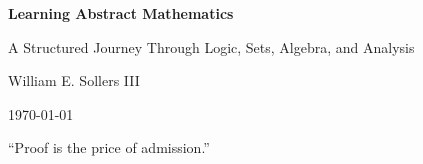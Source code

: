 \documentclass[12pt, a4paper]{report}
\begin{document}
\ExplSyntaxOff
\renewcommand{\familydefault}{\ttdefault}
\begin{titlepage}
  \centering
  \vspace*{2.5cm}
  {\Huge\bfseries Learning Abstract Mathematics\par}
  \vspace{1.5cm}
  {\Large A Structured Journey Through Logic, Sets, Algebra, and Analysis\par}
  \vspace{2.5cm}
  {\Large William E. Sollers III\par}
  \vspace{1cm}
  {\large \today\par}
  \vfill
  {\large ``Proof is the price of admission.''\par}
\end{titlepage}
\clearpage





\clearpage

\tableofcontents
\clearpage












\clearpage


\end{document}
